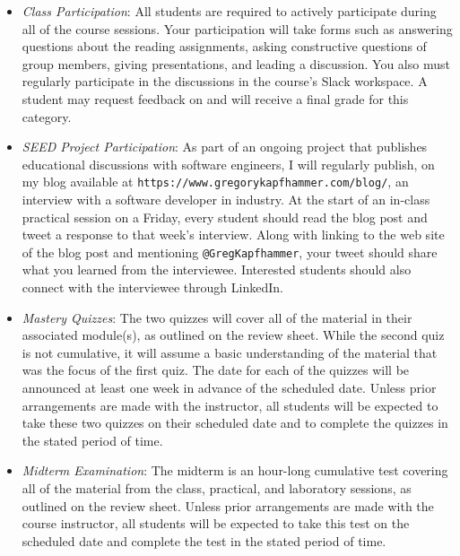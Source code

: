 \documentclass[11pt]{article}
\newcommand{\url}[1]{\lstinline{#1}}
\begin{document}
\vspace*{-.05in}

\begin{itemize}

  \item {\em Class Participation\/}: All students are required to actively
    participate during all of the course sessions. Your participation will take
    forms such as answering questions about the reading assignments, asking
    constructive questions of group members, giving presentations, and leading a
    discussion. You also must regularly participate in the discussions in the
    course's Slack workspace. A student may request feedback on and will receive a
    final grade for this category.

  \item {\em SEED Project Participation\/}: As part of an ongoing project that
    publishes educational discussions with software engineers, I will regularly
    publish, on my blog available at
    \url{https://www.gregorykapfhammer.com/blog/}, an interview with a software
    developer in industry. At the start of an in-class practical session on a
    Friday, every student should read the blog post and tweet a response to
    that week's interview. Along with linking to the web site of the blog post
    and mentioning \url{@GregKapfhammer}, your tweet should share what you
    learned from the interviewee. Interested students should also connect with
    the interviewee through LinkedIn.

  \item {\em Mastery Quizzes\/}: The two quizzes will cover all of the material
    in their associated module(s), as outlined on the review sheet. While the
    second quiz is not cumulative, it will assume a basic understanding of the
    material that was the focus of the first quiz. The date for each of the
    quizzes will be announced at least one week in advance of the scheduled
    date. Unless prior arrangements are made with the instructor, all students
    will be expected to take these two quizzes on their scheduled date and to
    complete the quizzes in the stated period of time.

  \item {\em Midterm Examination\/}: The midterm is an hour-long cumulative test
    covering all of the material from the class, practical, and laboratory
    sessions, as outlined on the review sheet. Unless prior arrangements are
    made with the course instructor, all students will be expected to take this
    test on the scheduled date and complete the test in the stated period of
    time.


\end{itemize}
\end{document}
